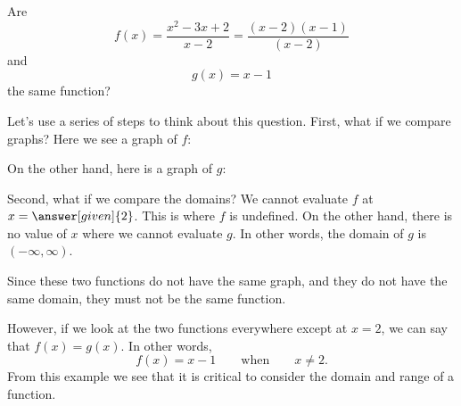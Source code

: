 \documentclass{ximera}
\begin{document}
\begin{example}
  Are 
  \[
  f(x) = \frac{x^2 - 3x + 2}{x-2} = \frac{(x-2)(x-1)}{(x-2)}
  \]
  and
  \[
  g(x) = x-1
  \]
  the same function?
  \begin{explanation}
  Let's use a series of steps to think about this question. 
    First, what if we compare graphs? Here we see a graph of
    $f$:
    \begin{image}
\end{image}
On the other hand, here is a graph of $g$:
\begin{image}
\end{image}
Second, what if we compare the domains?  We cannot evaluate $f$ at
$x=\answer[given]{2}$.  This is where $f$ is undefined.  On the other
hand, there is no value of $x$ where we cannot evaluate $g$.  In other
words, the domain of $g$ is $(-\infty, \infty)$.

Since these two functions do not have the same graph, and they do not
have the same domain, they must not be the same function.

However, if we look at the two functions everywhere except at $x = 2$, 
we can say that $f(x)=g(x)$.  In other words, 
\[
f(x)=x-1\qquad\text{when}\qquad \text{$x \ne 2$}.
\]
From this example we see that it is critical to consider the domain and
range of a function.
  \end{explanation}
\end{example}
\end{document}
